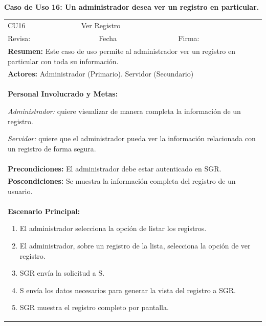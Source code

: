 		\textbf{Caso de Uso 16: Un administrador desea ver un registro en particular.}
			\begin{longtable}{|l|p{5.5cm}|l|p{2cm}|l|p{1.9cm}|} \hline
					\cellcolor{grisOscuro} CU16 & \multicolumn{4}{|l|}{  \cellcolor{grisOscuro} Ver Registro} &  \cellcolor{grisClaro}\multirow{2}{1cm}{} \\ \cline{1-5}
					\cellcolor{grisOscuro} Revisa: &  \cellcolor{grisClaro} &  \cellcolor{grisOscuro} Fecha &  \cellcolor{grisClaro} &  \cellcolor{grisOscuro} Firma: & \cellcolor{grisClaro} \\ \hline
					\multicolumn{6}{|p{15cm}|}{ \textbf{Resumen: } Este caso de uso permite al administrador ver un registro en particular con toda su información.

					} \\ \hline

					\multicolumn{6}{|p{15cm}|}{ \textbf{Actores: } Administrador (Primario). Servidor (Secundario)

					} \\ \hline

					\multicolumn{6}{|p{15cm}|}{ \textbf{Personal Involucrado y Metas: }
					
					\emph{Administrador:} quiere visualizar de manera completa la información de un registro.

					\emph{Servidor:} quiere que el administrador pueda ver la información relacionada con un registro de forma segura.

					} \\ \hline

					\multicolumn{6}{|p{15cm}|}{ \textbf{Precondiciones: } El administrador debe estar autenticado en SGR.

					} \\ \hline

					\multicolumn{6}{|p{15cm}|}{ \textbf{Poscondiciones: } Se muestra la información completa del registro de un usuario.

					} \\ \hline

					\multicolumn{6}{|p{15cm}|}{ \textbf{Escenario Principal: }

					\begin{enumerate}
							\item El administrador selecciona la opción de listar los registros.
							\item El administrador, sobre un registro de la lista, selecciona la opción de ver registro.
							\item SGR envía la solicitud a S.
							\item S envía los datos necesarios para generar la vista del registro a SGR.
							\item SGR muestra el registro completo por pantalla.
					\end{enumerate}

}
\end{longtable}
